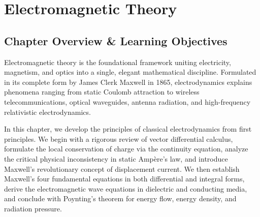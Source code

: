 \chapter{Electromagnetic Theory}
\label{chap:em-theory}

\section{Chapter Overview \& Learning Objectives}
Electromagnetic theory is the foundational framework uniting electricity, magnetism, and optics into a single, elegant mathematical discipline. Formulated in its complete form by James Clerk Maxwell in 1865, electrodynamics explains phenomena ranging from static Coulomb attraction to wireless telecommunications, optical waveguides, antenna radiation, and high-frequency relativistic electrodynamics.

In this chapter, we develop the principles of classical electrodynamics from first principles. We begin with a rigorous review of vector differential calculus, formulate the local conservation of charge via the continuity equation, analyze the critical physical inconsistency in static Ampère's law, and introduce Maxwell's revolutionary concept of displacement current. We then establish Maxwell's four fundamental equations in both differential and integral forms, derive the electromagnetic wave equations in dielectric and conducting media, and conclude with Poynting's theorem for energy flow, energy density, and radiation pressure.

